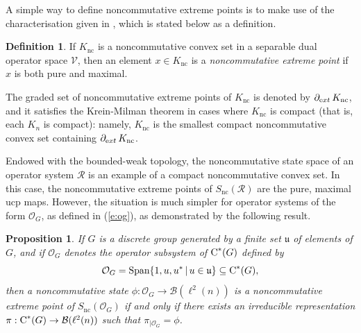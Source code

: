 \documentclass{amsart}
\newtheorem{proposition}[theorem]{Proposition}
\theoremstyle{definition}
\newtheorem{definition}[theorem]{Definition}
\theoremstyle{remark}
\newcommand{\B}{\mathcal{B}}
\newcommand\osr{{\mathcal R}}
\newcommand\cstar{{\textrm C}^*}                              %
\numberwithin{equation}{section}
\begin{document}
A simple way to define noncommutative extreme points is to make use of the characterisation given in \cite[Proposition 6.1.4]{davidson--kennedy2019},
which is stated below as a definition.


\begin{definition} If $K_{\textrm{nc}}$ is a noncommutative convex set in a separable dual operator space $\mathcal V$, then an element $x\in K_{\textrm{nc}}$
is a \emph{noncommutative extreme point} if $x$ is both pure and maximal.
\end{definition}

The graded set of noncommutative extreme points of $K_{\textrm{nc}}$ is denoted by $\partial_{\textrm ext}\,K_{\textrm{nc}}$, and it satisfies the Krein-Milman theorem
in cases where $K_{\textrm{nc}}$ is compact (that is, each $K_n$ is compact):
namely, $K_{\textrm{nc}}$ is the smallest compact noncommutative convex set containing $\partial_{\textrm ext}\,K_{\textrm{nc}}$.

Endowed with the bounded-weak topology, the 
noncommutative state space of an operator system $\osr$ is an example of a compact noncommutative convex set. 
In this case, the noncommutative extreme points of $S_{\textrm{nc}}(\osr)$ are the pure, maximal ucp maps. However, the situation
is much simpler for operator systems of the form $\mathcal O_G$, as defined in (\ref{e:og}), as demonstrated by the following
result.

\begin{proposition}\label{nce} If $G$ is a discrete group generated by a finite set $\mathfrak u$ of elements of $G$, 
and if $\mathcal O_G$ denotes the operator subsystem of $\cstar(G)$ 
defined by
\[
\mathcal O_{G}=\mbox{\textrm Span}\{1,u,u^*\,|\,u\in\mathfrak u\}\subseteq \cstar(G),
\]
then a noncommutative state $\phi:\mathcal O_G\rightarrow \B(\ell^2(n))$ is a noncommutative extreme point of
$S_{\textrm{nc}}(\mathcal O_G)$ if and only if there exists an irreducible representation $\pi:\cstar(G)\rightarrow \B(\ell^2(n))$
such that $\pi_{\vert \mathcal O_G}=\phi$.
\end{proposition}
\end{document}
